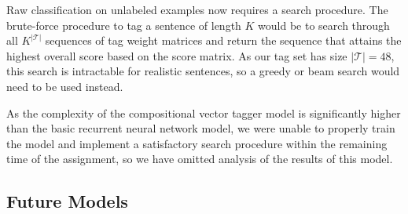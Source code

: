 \documentclass[11pt]{article}
\begin{document}
Raw classification on unlabeled examples now requires a search procedure. The brute-force procedure to tag a sentence of length $K$ would be to search through all $K^{\left\vert\mathcal{T}\right\vert}$ sequences of tag weight matrices and return the sequence that attains the highest overall score based on the score matrix. As our tag set has size $\left\vert\mathcal{T}\right\vert=48$, this search is intractable for realistic sentences, so a greedy or beam search would need to be used instead.

As the complexity of the compositional vector tagger model is significantly higher than the basic recurrent neural network model, we were unable to properly train the model and implement a satisfactory search procedure within the remaining time of the assignment, so we have omitted analysis of the results of this model.

\subsection{Future Models}\label{sec:futuremodel}
\end{document}
